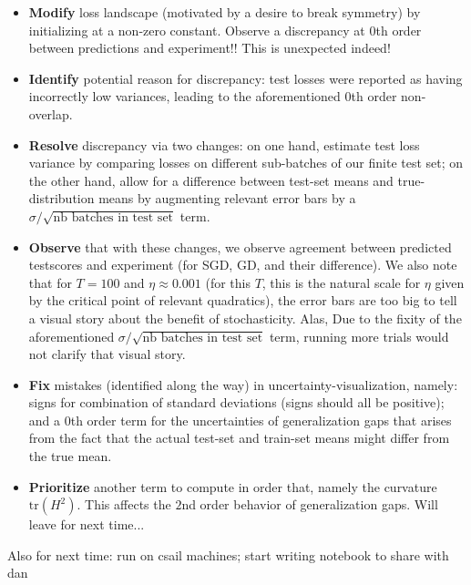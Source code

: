 \documentclass[12pt]{article}
\begin{document}
        \begin{itemize}
            \item {\bf Modify} loss landscape (motivated by a desire to break symmetry) by initializing at a non-zero
                constant.  Observe a discrepancy at $0$th order between predictions and experiment!!  This is
                unexpected indeed!
            \item {\bf Identify} potential reason for discrepancy: test losses were reported as having incorrectly low
                variances, leading to the aforementioned $0$th order non-overlap.
            \item {\bf Resolve} discrepancy via two changes: on one hand, estimate test loss variance by comparing
                losses on different sub-batches of our finite test set; on the other hand, allow for a difference
                between test-set means and true-distribution means by augmenting relevant error bars by a
                $\sigma/\sqrt{\text{nb batches in test set}}$ term.
            \item {\bf Observe} that with these changes, we observe agreement between predicted testscores and
                experiment (for SGD, GD, and their difference).  We also note that for $T=100$ and $\eta\approx 0.001$
                (for this $T$, this is the natural scale for $\eta$ given by the critical point of relevant
                quadratics), the error bars are too big to tell a visual story about the benefit of stochasticity. 
                Alas, Due to the fixity of the aforementioned $\sigma/\sqrt{\text{nb batches in test set}}$ term,
                running more trials would not clarify that visual story.   
            \item {\bf Fix} mistakes (identified along the way) in uncertainty-visualization, namely: signs for
                combination of standard deviations (signs should all be positive); and a $0$th order term for the
                uncertainties of generalization gaps that arises from the fact that the actual test-set and train-set
                means might differ from the true mean. 
            \item {\bf Prioritize} another term to compute in order that, namely the curvature $\text{tr}(H^2)$.  This
                affects the $2$nd order behavior of generalization gaps.  Will leave for next time...
        \end{itemize}

        Also for next time: run on csail machines; start writing notebook to share with dan
\end{document}
